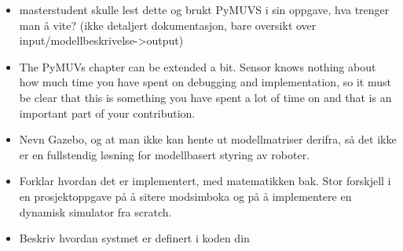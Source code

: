 {
    \color{red}
    \begin{itemize}
    \item masterstudent skulle lest dette og brukt PyMUVS i sin oppgave, hva trenger man å vite? (ikke detaljert dokumentasjon, bare oversikt over input/modellbeskrivelse->output)
    \item The PyMUVs chapter can be extended a bit. Sensor knows nothing about how much time you have spent on debugging and implementation, so it must be clear that this is something you have spent a lot of time on and that is an important part of your contribution.
    \item Nevn Gazebo, og at man ikke kan hente ut modellmatriser derifra, så det ikke er en fullstendig løsning for modellbasert styring av roboter.
    \item Forklar hvordan det er implementert, med matematikken bak. Stor forskjell i en prosjektoppgave på å sitere modsimboka og på å implementere en dynamisk simulator fra scratch.
    \item Beskriv hvordan systmet er definert i koden din
\end{itemize}
}
